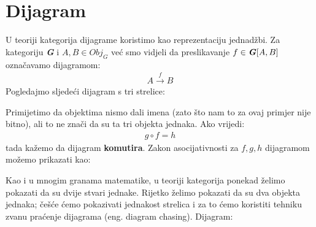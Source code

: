 \documentclass[11pt]{article}
\newcommand{\category}[1]{\textbf{\emph{#1}}}
\theoremstyle{definition}
\begin{document}
  \section{Dijagram}
  U teoriji kategorija dijagrame koristimo kao reprezentaciju jednadžbi.
  Za kategoriju \category{G} i $A, B \in Obj_G$ već smo vidjeli da
  preslikavanje $f \in \category{G}[A, B]$ označavamo dijagramom:
  \begin{align*}
    A \xrightarrow{f} B
  \end{align*}
  Pogledajmo sljedeći dijagram s tri strelice:
  \begin{center}
  \end{center}
  Primijetimo da objektima nismo dali imena (zato što nam to za ovaj primjer nije
  bitno), ali to ne znači da su ta tri objekta jednaka. Ako vrijedi:
  \begin{align*}
    g \circ f = h
  \end{align*}
  tada kažemo da dijagram \textbf{komutira}.
  Zakon asocijativnosti za $f, g, h$ dijagramom možemo prikazati kao:
  \begin{center}
  \end{center}


  Kao i u mnogim granama matematike, u teoriji kategorija ponekad želimo
  pokazati da su dvije stvari jednake. Rijetko želimo pokazati da su dva
  objekta jednaka; češće ćemo pokazivati jednakost strelica i za to ćemo
  koristiti tehniku zvanu praćenje dijagrama (eng. diagram chasing).
  Dijagram:
\end{document}
